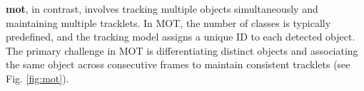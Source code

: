 \textbf{\acrfull{mot}}, in contrast, involves tracking multiple objects simultaneously and maintaining multiple tracklets. In MOT, the number of classes is typically predefined, and the tracking model assigns a unique ID to each detected object. The primary challenge in MOT is differentiating distinct objects and associating the same object across consecutive frames to maintain consistent tracklets (see Fig. \ref{fig:mot}).





